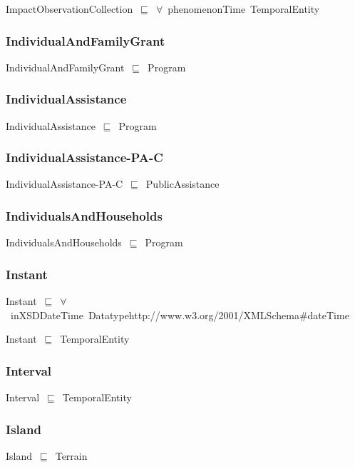 \documentclass{article}
\begin{document}
ImpactObservationCollection~\ensuremath{\sqsubseteq}~\ensuremath{\forall}~phenomenonTime~TemporalEntity~

\subsubsection*{IndividualAndFamilyGrant}

IndividualAndFamilyGrant~\ensuremath{\sqsubseteq}~Program~

\subsubsection*{IndividualAssistance}

IndividualAssistance~\ensuremath{\sqsubseteq}~Program~

\subsubsection*{IndividualAssistance-PA-C}

IndividualAssistance-PA-C~\ensuremath{\sqsubseteq}~PublicAssistance~

\subsubsection*{IndividualsAndHouseholds}

IndividualsAndHouseholds~\ensuremath{\sqsubseteq}~Program~

\subsubsection*{Instant}

Instant~\ensuremath{\sqsubseteq}~\ensuremath{\forall}~inXSDDateTime~Datatypehttp://www.w3.org/2001/XMLSchema#dateTime~

Instant~\ensuremath{\sqsubseteq}~TemporalEntity~

\subsubsection*{Interval}

Interval~\ensuremath{\sqsubseteq}~TemporalEntity~

\subsubsection*{Island}

Island~\ensuremath{\sqsubseteq}~Terrain~
\end{document}
